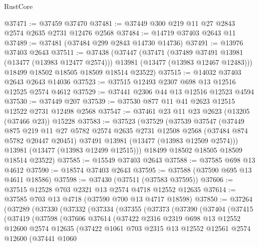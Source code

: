 \begin{lexlean}{RustCore}
\begin{coremodule}
@37471 := @37459 @37470
@37481 := @37449 @300 @219 @11 @27 @2843 @2574 @2635 @2731 @12476 @2568
@37484 := @14719 @37403 @2643 @11
@37489 := @37481 (@37484 @299 @2843 @14730 @14736)
@37491 := @13976 @37403 @2643
@37511 := @37438
    (@37447
      (@37471
        (@37489 @37491 @13981 (@13477 (@13983 @12477 @2574)))
        @13981
        (@13477 (@13983 @12467 @12483)))
      @18499
      @18502
      @18505
      @18509
      @18514
      @23522)
@37515 := @14032 @37403 @2643 @2643 @14036
@37523 := @37515 @12493 @2307 @698 @13 @12516 @12525 @2574 @4612
@37529 := @37441 @2306 @44 @13 @12516 @12523 @4594
@37530 := @37449 @207
@37539 := @37530 @877 @11 @41 @2623 @12515 @12522 @2731 @12498 @2568
@37547 := @37461 @23 @11 @23 @2623 (@13205 (@37466 @23)) @15228
@37583 := @37523
    (@37529
      (@37539
        @37547
        (@37449
          @875
          @219
          @11
          @27
          @5782
          @2574
          @2635
          @2731
          @12508
          @2568
          (@37484 @874 @5782 @20447 @20451)
          @37491
          @13981
          (@13477 (@13983 @12509 @2574)))
        @13981
        (@13477 (@13983 @12499 @12515)))
      @18499
      @18502
      @18505
      @18509
      @18514
      @23522)
@37585 := @15549 @37403 @2643
@37588 := @37585 @698 @13 @4612
@37590 := @18574 @37403 @2643
@37595 := @37588 (@37590 @695 @13 @4611 @18586)
@37598 := @37430 (@37511 (@37583 @37595))
@37606 := @37515 @12528 @703 @2321 @13 @2574 @4718 @12552 @12635
@37614 := @37585 @703 @13 @4718 (@37590 @700 @13 @4717 @18598)
@37850 := @37264
    (@37289
      (@37330
        (@37332
          (@37334
            (@37355
              (@37373
                (@37390
                  (@37404
                    (@37415
                      (@37419
                        (@37598
                          (@37606
                            @37614
                            (@37422
                              @2316
                              @2319
                              @698
                              @13
                              @12552
                              @12600
                              @2574
                              @12635
                              (@37422
                                @1061
                                @703
                                @2315
                                @13
                                @12552
                                @12561
                                @2574
                                @12600
                                (@37441
                                  @1060

\end{coremodule}
\end{lexlean}
